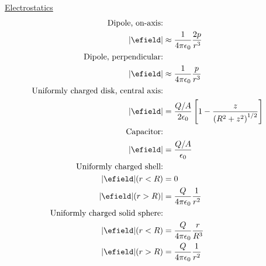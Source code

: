 \begin{multicols}{2}
\begin{minipage}{\columnwidth}
\centering\underline{Electrostatics}
\begin{align*}
\text{Dipole, on-axis:}\\ |\efield|&\approx \frac{1}{4\pi\epsilon_0}\frac{2p}{r^3}\\
\text{Dipole, perpendicular:}\\ |\efield|&\approx \frac{1}{4\pi\epsilon_0}\frac{p}{r^3}\\
\text{Uniformly charged disk, central axis:}\\|\efield|&=\frac{Q/A}{2\epsilon_0}\left[1-\frac{z}{\left(R^2+z^2\right)^{1/2}}\right]\\
\text{Capacitor:}\\|\efield|&=\frac{Q/A}{\epsilon_0}\\
\text{Uniformly charged shell:}\\
|\efield|(r<R) &= 0\\|\efield|(r>R)|&=\frac{Q}{4\pi\epsilon_0}\frac{1}{r^2}\\
\text{Uniformly charged solid sphere:}\\
|\efield|(r<R)&=\frac{Q}{4\pi\epsilon_0}\frac{r}{R^3}\\
|\efield|(r>R)&=\frac{Q}{4\pi\epsilon_0}\frac{1}{r^2}
\end{align*}
\end{minipage}

\end{multicols}